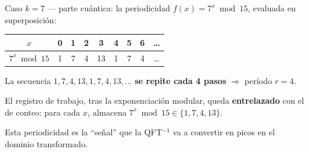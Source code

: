 \documentclass[aspectratio=169]{beamer}
\begin{document}
\begin{frame}{Caso $k=7$ — parte cuántica: la periodicidad}
  $f(x)=7^x\bmod 15$, evaluada en superposición:

  \begin{center}
  \begin{tabular}{c|cccccccc}
    \toprule
    $x$     & 0 & 1 & 2 & 3  & 4 & 5 & 6 & \ldots \\
    \midrule
    $7^x\bmod 15$ & 1 & 7 & 4 & 13 & 1 & 7 & 4 & \ldots \\
    \bottomrule
  \end{tabular}
  \end{center}

  \vspace{0.4em}
  La secuencia $1,7,4,13,1,7,4,13,\ldots$ \textbf{se repite cada 4 pasos}
  $\Rightarrow$ período $r=4$.

  El registro de trabajo, tras la exponenciación modular, queda
  \textbf{entrelazado} con el de conteo: para cada $x$, almacena
  $7^x\bmod 15\in\{1,7,4,13\}$.

  \begin{block}{}
    \small Esta periodicidad es la ``señal'' que la QFT$^{-1}$ va a convertir
    en picos en el dominio transformado.
  \end{block}

\end{frame}
\end{document}
